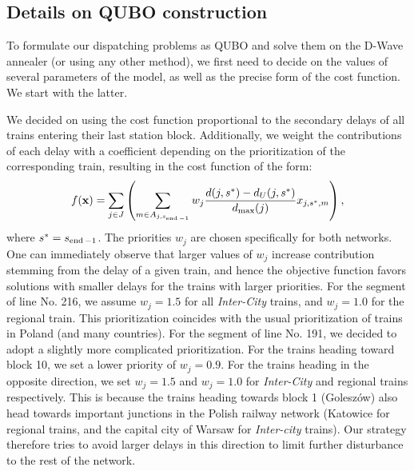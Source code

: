 \subsection{Details on QUBO construction}

To formulate our dispatching problems as QUBO and solve them on the D-Wave
annealer (or using any other method), we first need to decide on the values of
several parameters of the model, as well as the precise form of the cost
function. We start with the latter.

We decided on using the cost function proportional to the secondary delays of
all trains entering their last station block. Additionally, we weight the
contributions of each delay with a coefficient depending on the prioritization
of the corresponding train, resulting in the cost function of the form:
\begin{equation}
  f(\mathbf{x}) = \sum_{j \in J}\left(\sum_{m  \in A_{j,s_{\operatorname*{end}-1}}}w_{j} \frac{d(j,s^{*}) - d_{U}(j,s^{*})}{d_{\max}(j)}x_{j,s^{*},m}\right),
\end{equation}
where $s^{*} = s_{\operatorname*{end}-1}$. The priorities $w_{j}$ are chosen specifically
    for both networks. One can immediately observe that larger values of $w_{j}$
    increase contribution stemming from the delay of a given train, and hence the
    objective function favors solutions with smaller delays for the trains with
    larger priorities. For the segment of line No. 216, we assume $w_{j}= 1.5$ for
all \emph{Inter-City} trains, and $w_{j}=1.0$ for the regional train. This
    prioritization coincides with the usual prioritization of trains in Poland (and
    many countries). For the segment of line No. 191, we decided to adopt a
    slightly more complicated prioritization. For the trains heading toward block
    10, we set a lower priority of $w_{j}=0.9$. For the trains heading in the
    opposite direction, we set $w_{j}=1.5$ and $w_{j}=1.0$ for \emph{Inter-City}
and regional trains respectively. This is because the trains heading towards
block 1 (Goleszów) also head towards important junctions in the Polish railway
network (Katowice for regional trains, and the capital city of Warsaw for
\emph{Inter-city} trains). Our strategy therefore tries to avoid larger delays
in this direction to limit further disturbance to the rest of the network.


